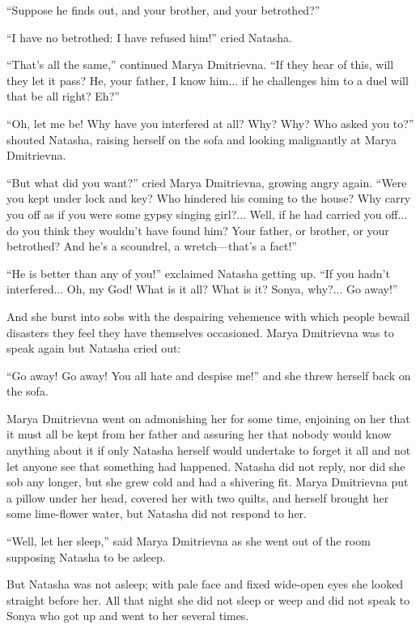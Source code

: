 ``Suppose he finds out, and your brother, and your betrothed?''

``I have no betrothed: I have refused him!'' cried Natasha.

``That's all the same,'' continued Marya Dmitrievna. ``If they
hear of this, will they let it pass? He, your father, I know
him... if he challenges him to a duel will that be all right?
Eh?''

``Oh, let me be! Why have you interfered at all? Why? Why? Who
asked you to?'' shouted Natasha, raising herself on the sofa and
looking malignantly at Marya Dmitrievna.

``But what did you want?'' cried Marya Dmitrievna, growing angry
again.  ``Were you kept under lock and key? Who hindered his
coming to the house?  Why carry you off as if you were some gypsy
singing girl?... Well, if he had carried you off... do you think
they wouldn't have found him? Your father, or brother, or your
betrothed? And he's a scoundrel, a wretch---that's a fact!''

``He is better than any of you!'' exclaimed Natasha getting
up. ``If you hadn't interfered... Oh, my God! What is it all?
What is it? Sonya, why?... Go away!''

And she burst into sobs with the despairing vehemence with which
people bewail disasters they feel they have themselves
occasioned. Marya Dmitrievna was to speak again but Natasha cried
out:

``Go away! Go away! You all hate and despise me!'' and she threw
herself back on the sofa.

Marya Dmitrievna went on admonishing her for some time, enjoining
on her that it must all be kept from her father and assuring her
that nobody would know anything about it if only Natasha herself
would undertake to forget it all and not let anyone see that
something had happened.  Natasha did not reply, nor did she sob
any longer, but she grew cold and had a shivering fit. Marya
Dmitrievna put a pillow under her head, covered her with two
quilts, and herself brought her some lime-flower water, but
Natasha did not respond to her.

``Well, let her sleep,'' said Marya Dmitrievna as she went out of
the room supposing Natasha to be asleep.

But Natasha was not asleep; with pale face and fixed wide-open
eyes she looked straight before her. All that night she did not
sleep or weep and did not speak to Sonya who got up and went to
her several times.


